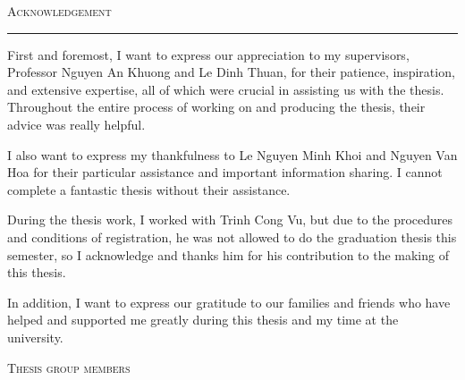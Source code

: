 \thispagestyle{empty}
\vspace*{3cm}
\noindent\Huge\textsc{Acknowledgement}\\
\normalsize
\noindent\rule[2pt]{\textwidth}{0.8pt}
\hspace*{5cm}
 
First and foremost, I want to express our appreciation to my supervisors, Professor Nguyen An Khuong and Le Dinh Thuan, for their patience, inspiration, and extensive expertise, all of which were crucial in assisting us with the thesis. Throughout the entire process of working on and producing the thesis, their advice was really helpful.

I also want to express my thankfulness to Le Nguyen Minh Khoi and Nguyen Van Hoa for their particular assistance and important information sharing. I cannot complete a fantastic thesis without their assistance.

During the thesis work, I worked with Trinh Cong Vu, but due to the procedures and conditions of registration, he was not allowed to do the graduation thesis this semester, so I acknowledge and thanks him for his contribution to the making of this thesis.

In addition, I want to express our gratitude to our families and friends who have helped and supported me greatly during this thesis and my time at the university.
	
	\hfill \textsc{Thesis group members}
	
\cleardoublepage
